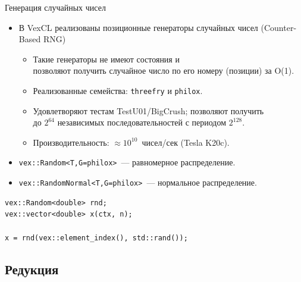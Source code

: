 \documentclass[@BEAMER_OPTIONS@]{beamer}
\newcommand{\code}[1]{\lstinline|#1|}
\begin{document}
\begin{frame}[fragile]{Генерация случайных чисел}
    \begin{itemize}
        \item В VexCL реализованы позиционные генераторы случайных чисел
            (Counter-Based RNG)
            \begin{itemize}
                \item Такие генераторы не имеют состояния и\\ позволяют
                    получить случайное число по его номеру (позиции) за O(1).
                \item Реализованные семейства: \code{threefry} и \code{philox}.
                \item Удовлетворяют тестам TestU01/BigCrush; позволяют
                    получить\\ до \alert{$2^{64}$} независимых
                    последовательностей с периодом \alert{$2^{128}$}.
                \item Производительность: \alert{$\approx 10^{10}$}~чисел/сек
                    (Tesla K20c).
            \end{itemize}
        \item \code{vex::Random<T,G=philox>}~--- равномерное распределение.
        \item \code{vex::RandomNormal<T,G=philox>}~--- нормальное распределение.
    \end{itemize}
    \begin{exampleblock}{}
        \begin{lstlisting}
vex::Random<double> rnd;
vex::vector<double> x(ctx, n);

x = rnd(vex::element_index(), std::rand());
        \end{lstlisting}
    \end{exampleblock}
\end{frame}


\subsection{Редукция}
\end{document}
